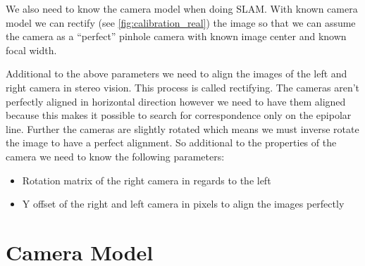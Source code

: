 \documentclass[11pt,a4paper,titlepage,oneside]{report}
\begin{document}
We also need to know the camera model when doing SLAM. With known camera model we can rectify (see \ref{fig:calibration_real}) the image so that we can assume the camera as a ``perfect'' pinhole camera with known image center and known focal width.

Additional to the above parameters we need to align the images of the left and right camera in stereo vision. This process is called rectifying. The cameras aren't perfectly aligned in horizontal direction however we need to have them aligned because this makes it possible to search for correspondence only on the epipolar line. Further the cameras are slightly rotated which means we must inverse rotate the image to have a perfect alignment. So additional to the properties of the camera we need to know the following parameters:
\begin{itemize}
	\item Rotation matrix of the right camera in regards to the left
	\item Y offset of the right and left camera in pixels to align the images perfectly
\end{itemize}

\section{Camera Model}
\end{document}
